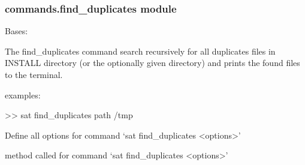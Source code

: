 \documentclass[a4paper,10pt,english]{sphinxmanual}
\begin{document}
\subsubsection{commands.find\_duplicates module}
\label{\detokenize{apidoc_commands/commands:module-commands.find_duplicates}}\label{\detokenize{apidoc_commands/commands:commands-find-duplicates-module}}

\begin{fulllineitems}
\label{\detokenize{apidoc_commands/commands:commands.find_duplicates.Command}}
Bases: 

The find\_duplicates command search recursively for all duplicates files
in INSTALL directory (or the optionally given directory) and 
prints the found files to the terminal.

\begin{DUlineblock}{0em}
\item[] examples:
\item[] \textgreater{}\textgreater{} sat find\_duplicates \textendash{}path /tmp
\end{DUlineblock}

\begin{fulllineitems}
\label{\detokenize{apidoc_commands/commands:commands.find_duplicates.Command.getParser}}
Define all options for command ‘sat find\_duplicates \textless{}options\textgreater{}’

\end{fulllineitems}


\begin{fulllineitems}
\label{\detokenize{apidoc_commands/commands:commands.find_duplicates.Command.name}}
\end{fulllineitems}


\begin{fulllineitems}
\label{\detokenize{apidoc_commands/commands:commands.find_duplicates.Command.run}}
method called for command ‘sat find\_duplicates \textless{}options\textgreater{}’

\end{fulllineitems}


\end{fulllineitems}
\end{document}
